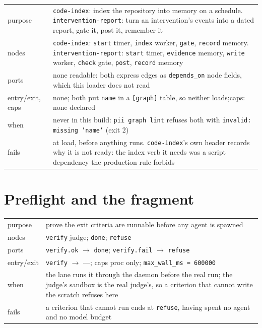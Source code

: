 \begin{center}\footnotesize
\begin{tabular}{@{}>{\raggedright\arraybackslash}p{}>{\raggedright\arraybackslash}p{}@{}}
  purpose & \texttt{code-index}: index the repository into memory on a schedule.
    \texttt{intervention-report}: turn an intervention's events into a dated report, gate it,
    post it, remember it \\
  nodes & \texttt{code-index}: \texttt{start} timer, \texttt{index} worker, \texttt{gate},
    \texttt{record} memory. \texttt{intervention-report}: \texttt{start} timer,
    \texttt{evidence} memory, \texttt{write} worker, \texttt{check} gate, \texttt{post},
    \texttt{record} memory \\
  ports & none readable: both express edges as \texttt{depends\_on} node fields, which this
    loader does not read \\
  entry/exit, caps & none; both put \texttt{name} in a \texttt{[graph]} table, so neither loads;\newline caps: none declared \\
  when & never in this build: \texttt{pii graph lint} refuses both with
    \texttt{invalid: missing 'name'} (exit 2) \\
  fails & at load, before anything runs. \texttt{code-index}'s own header records why it is
    not ready: the index verb it needs was a script dependency the production rule forbids \\
\end{tabular}
\end{center}

\section{Preflight and the fragment}

\begin{center}\footnotesize
\begin{tabular}{@{}>{\raggedright\arraybackslash}p{}>{\raggedright\arraybackslash}p{}@{}}
  purpose & prove the exit criteria are runnable before any agent is spawned \\
  nodes & \texttt{verify} judge; \texttt{done}; \texttt{refuse} \\
  ports & \texttt{verify.ok} $\to$ \texttt{done}; \texttt{verify.fail} $\to$ \texttt{refuse} \\
  entry/exit & \texttt{verify} $\to$ ---; caps proc only; \texttt{max\_wall\_ms = 600000} \\
  when & the lane runs it through the daemon before the real run; the judge's sandbox is the
    real judge's, so a criterion that cannot write the scratch refuses here \\
  fails & a criterion that cannot run ends at \texttt{refuse}, having spent no agent and no
    model budget \\
\end{tabular}
\end{center}

